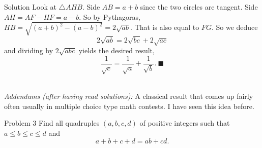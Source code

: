 \documentclass{article}
\begin{document}
\begin{solution}{Solution}
Look at $\triangle AHB$. Side $AB = a+b$ since the two circles are tangent.
Side $AH = AF - HF = a - b$. So by Pythagoras,
$HB = \sqrt{(a+b)^2 - (a-b)^2} = 2\sqrt{ab}$. That is also equal to $FG$.
So we deduce
$$
2\sqrt{ab} = 2\sqrt{bc} + 2\sqrt{ac}
$$
and dividing by $2\sqrt{abc}$ yields the desired result,
$$
\frac{1}{\sqrt{c}} = \frac{1}{\sqrt{a}} + \frac{1}{\sqrt{b}}. \ \blacksquare
$$
\\

\hline
\vspace{0.2cm}

\textit{Addendums (after having read solutions):} A classical result that
comes up fairly often usually in multiple choice type math contests.
I have seen this idea before.
\end{solution}
\newpage

\begin{problem}{Problem 3}
Find all quadruples $(a,b,c,d)$ of positive integers such that
$a \leq b \leq c \leq d$ and
$$
a + b + c + d = ab + cd.
$$
\end{problem}
\end{document}
